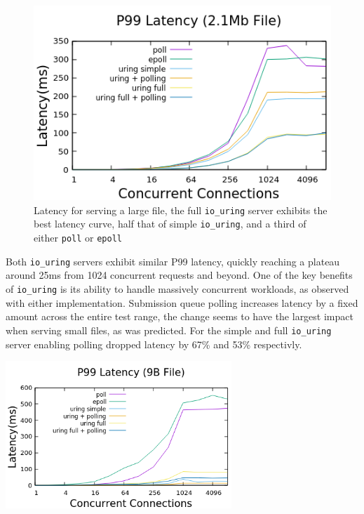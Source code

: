 \documentclass[letterpaper, 10pt, twocolumn]{article}
\begin{document}
\begin{figure}
\centering
\includegraphics[width=4.5in]{big_latency.png}
\caption{Latency for serving a large file, the full \texttt{io\_uring} server exhibits the best latency curve, half that of simple \texttt{io\_uring}, and a third of either \texttt{poll} or \texttt{epoll}}
\end{figure}

Both \texttt{io\_uring} servers exhibit similar P99 latency, quickly reaching a plateau around 25ms from 1024 concurrent requests and beyond. One of the key benefits of \texttt{io\_uring} is its ability to handle massively concurrent workloads, as observed with either implementation. Submission queue polling increases latency by a fixed amount across the entire test range, the change seems to have the largest impact when serving small files, as was predicted. For the simple and full \texttt{io\_uring} server enabling polling dropped latency by 67\% and 53\% respectivly.

\begin{center}
\includegraphics[width=3.35in]{small_latency.png}
\end{center}
\end{document}
